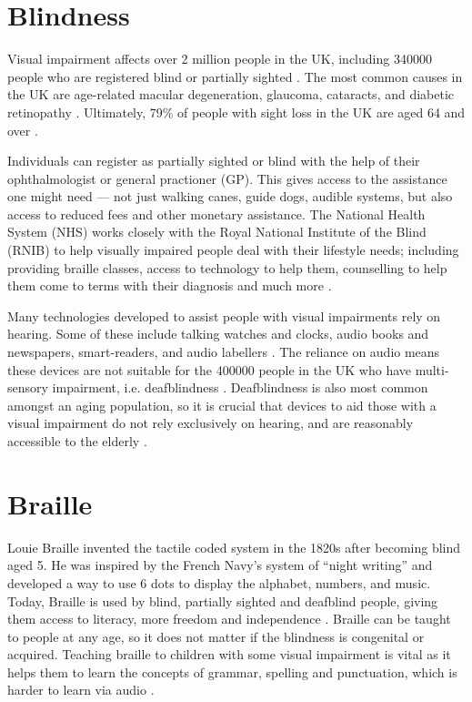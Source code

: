 \section{Blindness}
Visual impairment affects over 2 million people in the UK, including \num{340000} people who are registered blind or partially sighted \cite{national_health_system_england_blindness_2017}.
The most common causes in the UK are age-related macular degeneration, glaucoma, cataracts, and diabetic retinopathy \cite{fight_for_sight_facts_nodate}.
Ultimately, 79\% of people with sight loss in the UK are aged 64 and over \cite{royal_national_institute_of_blind_people_key_nodate}.

Individuals can register as partially sighted or blind with the help of their ophthalmologist or general practioner (GP).
This gives access to the assistance one might need --- not just walking canes, guide dogs, audible systems, but also access to reduced fees and other monetary assistance.
The National Health System (NHS) works closely with the Royal National Institute of the Blind (RNIB) to help visually impaired people deal with their lifestyle needs; including providing braille classes, access to technology to help them, counselling to help them come to terms with their diagnosis and much more \cite{royal_national_institute_of_blind_people_key_nodate}.

Many technologies developed to assist people with visual impairments rely on hearing.
Some of these include talking watches and clocks, audio books and newspapers, smart-readers, and audio labellers \cite{royal_national_institute_of_blind_people_audio_nodate}. 
The reliance on audio means these devices are not suitable for the \num{400000} people in the UK who have multi-sensory impairment, i.e. deafblindness \cite{royal_national_institute_of_blind_people_key_nodate}.
Deafblindness is also most common amongst an aging population, so it is crucial that devices to aid those with a visual impairment do not rely exclusively on hearing, and are reasonably accessible to the elderly \cite{sense_deafblindness_nodate,deafblind_uk_what_nodate,national_health_system_england_deafblindness_2017}.  

\section{Braille}
Louie Braille invented the tactile coded system in the 1820s after becoming blind aged 5.
He was inspired by the French Navy's system of ``night writing'' and developed a way to use 6 dots to display the alphabet, numbers, and music.
Today, Braille is used by blind, partially sighted and deafblind people, giving them access to literacy, more freedom and independence \cite{sight_scotland_who_nodate}.
Braille can be taught to people at any age, so it does not matter if the blindness is congenital or acquired.
Teaching braille to children with some visual impairment is vital as it helps them to learn the concepts of grammar, spelling and punctuation, which is harder to learn via audio \cite{sight_scotland_what_nodate}.  

